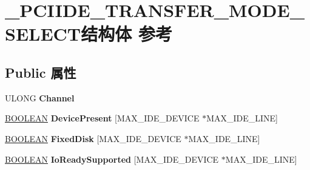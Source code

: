 \hypertarget{struct___p_c_i_i_d_e___t_r_a_n_s_f_e_r___m_o_d_e___s_e_l_e_c_t}{}\section{\+\_\+\+P\+C\+I\+I\+D\+E\+\_\+\+T\+R\+A\+N\+S\+F\+E\+R\+\_\+\+M\+O\+D\+E\+\_\+\+S\+E\+L\+E\+C\+T结构体 参考}
\label{struct___p_c_i_i_d_e___t_r_a_n_s_f_e_r___m_o_d_e___s_e_l_e_c_t}
\subsection*{Public 属性}
\begin{DoxyCompactItemize}
\item 
\mbox{\label{struct___p_c_i_i_d_e___t_r_a_n_s_f_e_r___m_o_d_e___s_e_l_e_c_t_a812958f1c4aab46dd30ea9c1e09a3c9a}} 
U\+L\+O\+NG {\bfseries Channel}
\item 
\mbox{\label{struct___p_c_i_i_d_e___t_r_a_n_s_f_e_r___m_o_d_e___s_e_l_e_c_t_ae9b14e12ce067123a4f13d99ac50a66a}} 
\hyperlink{_processor_bind_8h_a112e3146cb38b6ee95e64d85842e380a}{B\+O\+O\+L\+E\+AN} {\bfseries Device\+Present} \mbox{[}M\+A\+X\+\_\+\+I\+D\+E\+\_\+\+D\+E\+V\+I\+CE $\ast$M\+A\+X\+\_\+\+I\+D\+E\+\_\+\+L\+I\+NE\mbox{]}
\item 
\mbox{\label{struct___p_c_i_i_d_e___t_r_a_n_s_f_e_r___m_o_d_e___s_e_l_e_c_t_aab42e73cbfd642d0d67d5f0829d977e9}} 
\hyperlink{_processor_bind_8h_a112e3146cb38b6ee95e64d85842e380a}{B\+O\+O\+L\+E\+AN} {\bfseries Fixed\+Disk} \mbox{[}M\+A\+X\+\_\+\+I\+D\+E\+\_\+\+D\+E\+V\+I\+CE $\ast$M\+A\+X\+\_\+\+I\+D\+E\+\_\+\+L\+I\+NE\mbox{]}
\item 
\mbox{\label{struct___p_c_i_i_d_e___t_r_a_n_s_f_e_r___m_o_d_e___s_e_l_e_c_t_a3377e5d2c1ae52aa71c96e313fffaa3c}} 
\hyperlink{_processor_bind_8h_a112e3146cb38b6ee95e64d85842e380a}{B\+O\+O\+L\+E\+AN} {\bfseries Io\+Ready\+Supported} \mbox{[}M\+A\+X\+\_\+\+I\+D\+E\+\_\+\+D\+E\+V\+I\+CE $\ast$M\+A\+X\+\_\+\+I\+D\+E\+\_\+\+L\+I\+NE\mbox{]}

\end{DoxyCompactItemize}
